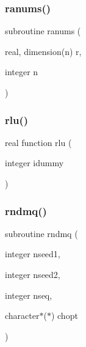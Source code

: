 \mbox{\label{gmc__random_8f_a2257c5764d872d6d6d31f0266aa08635}} 
\subsubsection{\texorpdfstring{ranums()}{ranums()}}
{\footnotesize\ttfamily subroutine ranums (\begin{DoxyParamCaption}\item[{real, dimension(n)}]{r,  }\item[{integer}]{n }\end{DoxyParamCaption})}

\mbox{\label{gmc__random_8f_acbbdf0219bb77063d42c5ead04a95992}} 
\subsubsection{\texorpdfstring{rlu()}{rlu()}}
{\footnotesize\ttfamily real function rlu (\begin{DoxyParamCaption}\item[{integer}]{idummy }\end{DoxyParamCaption})}

\mbox{\label{gmc__random_8f_a9f7e299636d9aa908be5751ad6cc3b3f}} 
\subsubsection{\texorpdfstring{rndmq()}{rndmq()}}
{\footnotesize\ttfamily subroutine rndmq (\begin{DoxyParamCaption}\item[{integer}]{nseed1,  }\item[{integer}]{nseed2,  }\item[{integer}]{nseq,  }\item[{character$\ast$($\ast$)}]{chopt }\end{DoxyParamCaption})}

